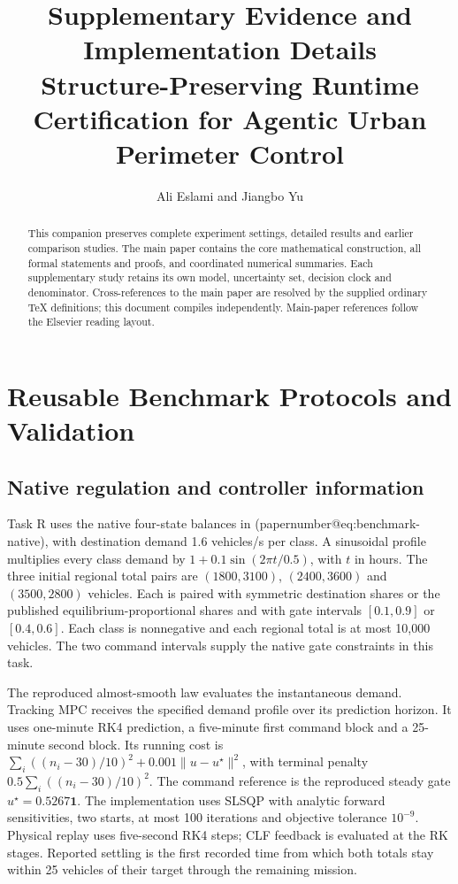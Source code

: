 \documentclass[preprint,12pt]{elsarticle}
\makeatletter
\numberwithin{equation}{section}
\newcommand{\papernumber}[1]{\csname papernumber@#1\endcsname}
\makeatother
\begin{document}
\begin{frontmatter}
\title{Supplementary Evidence and Implementation Details\\
Structure-Preserving Runtime Certification for Agentic Urban Perimeter Control}
\author{Ali Eslami and Jiangbo Yu}
\begin{abstract}
This companion preserves complete experiment settings, detailed results and
earlier comparison studies. The main paper contains the core mathematical
construction, all formal statements and proofs, and coordinated numerical
summaries. Each supplementary study retains its own model, uncertainty set,
decision clock and denominator. Cross-references to the main paper are
resolved by the supplied ordinary TeX definitions; this document compiles
independently. Main-paper references follow the Elsevier reading layout.
\end{abstract}
\end{frontmatter}
\tableofcontents
\clearpage
\section{Reusable Benchmark Protocols and Validation}
\label{app:reusable-benchmark}

\subsection{Native regulation and controller information}
Task R uses the native four-state balances in
(\papernumber{eq:benchmark-native}), with destination demand 1.6 vehicles/s per
class. A sinusoidal profile multiplies every class demand by
$1+0.1\sin(2\pi t/0.5)$, with $t$ in hours. The three initial regional
total pairs are $(1800,3100)$, $(2400,3600)$ and $(3500,2800)$ vehicles.
Each is paired with symmetric destination shares or the published
equilibrium-proportional shares and with gate intervals $[0.1,0.9]$ or
$[0.4,0.6]$. Each class is nonnegative and each regional total is at
most 10,000 vehicles. The two command intervals supply the native gate
constraints in this task.

The reproduced almost-smooth law evaluates the instantaneous demand.
Tracking MPC receives the specified demand profile over its prediction
horizon. It uses one-minute RK4 prediction, a five-minute first command
block and a 25-minute second block. Its running cost is
$\sum_i((n_i-30)/10)^2+0.001\|u-u^\star\|^2$, with terminal penalty
$0.5\sum_i((n_i-30)/10)^2$. The command reference is the reproduced
steady gate $u^\star=0.5267\mathbf1$. The implementation uses SLSQP
with analytic forward sensitivities, two starts, at most 100 iterations
and objective tolerance $10^{-9}$. Physical replay uses five-second
RK4 steps; CLF feedback is evaluated at the RK stages. Reported settling
is the first recorded time from which both totals stay within 25
vehicles of their target through the remaining mission.
\end{document}
